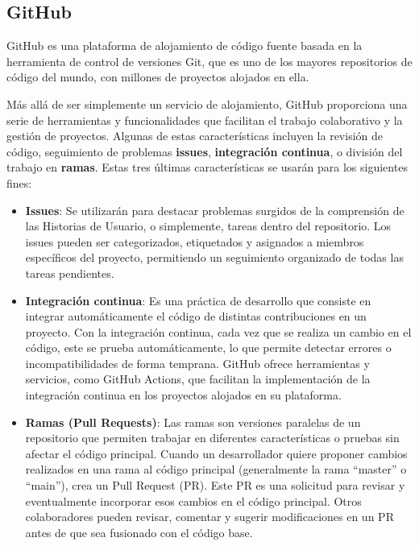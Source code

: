 \subsection{GitHub}

GitHub es una plataforma de alojamiento de código fuente basada en la herramienta de control de versiones Git, que es uno de los mayores repositorios de código del mundo, con millones de proyectos alojados en ella.

\vspace{0.5cm}

Más allá de ser simplemente un servicio de alojamiento, GitHub proporciona una serie de herramientas y funcionalidades que facilitan el trabajo colaborativo y la gestión de proyectos. Algunas de estas características incluyen la revisión de código, seguimiento de problemas \textbf{issues}, \textbf{integración continua}, o división del trabajo en \textbf{ramas}. Estas tres últimas características se usarán para los siguientes fines:

\begin{itemize}
    \item \textbf{Issues}: Se utilizarán para destacar problemas surgidos de la comprensión de las Historias de Usuario, o simplemente, tareas dentro del repositorio. Los issues pueden ser categorizados, etiquetados y asignados a miembros específicos del proyecto, permitiendo un seguimiento organizado de todas las tareas pendientes.
    
    \item \textbf{Integración continua}: Es una práctica de desarrollo que consiste en integrar automáticamente el código de distintas contribuciones en un proyecto. Con la integración continua, cada vez que se realiza un cambio en el código, este se prueba automáticamente, lo que permite detectar errores o incompatibilidades de forma temprana. GitHub ofrece herramientas y servicios, como GitHub Actions, que facilitan la implementación de la integración continua en los proyectos alojados en su plataforma.
    
    \item \textbf{Ramas (Pull Requests)}: Las ramas son versiones paralelas de un repositorio que permiten trabajar en diferentes características o pruebas sin afectar el código principal. Cuando un desarrollador quiere proponer cambios realizados en una rama al código principal (generalmente la rama ``master'' o ``main''), crea un Pull Request (PR). Este PR es una solicitud para revisar y eventualmente incorporar esos cambios en el código principal. Otros colaboradores pueden revisar, comentar y sugerir modificaciones en un PR antes de que sea fusionado con el código base.
\end{itemize}

